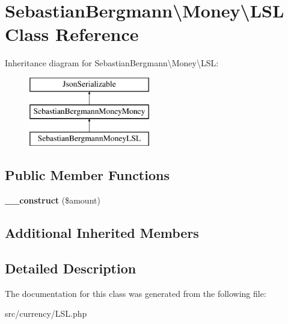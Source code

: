 \hypertarget{classSebastianBergmann_1_1Money_1_1LSL}{}\section{Sebastian\+Bergmann\textbackslash{}Money\textbackslash{}L\+S\+L Class Reference}
\label{classSebastianBergmann_1_1Money_1_1LSL}
Inheritance diagram for Sebastian\+Bergmann\textbackslash{}Money\textbackslash{}L\+S\+L\+:\begin{figure}[H]
\begin{center}
\leavevmode
\includegraphics[height=3.000000cm]{classSebastianBergmann_1_1Money_1_1LSL}
\end{center}
\end{figure}
\subsection*{Public Member Functions}
\begin{DoxyCompactItemize}
\item 
\hypertarget{classSebastianBergmann_1_1Money_1_1LSL_a2327731b4958ba08355ab1673d9d60eb}{}{\bfseries \+\_\+\+\_\+construct} (\$amount)\label{classSebastianBergmann_1_1Money_1_1LSL_a2327731b4958ba08355ab1673d9d60eb}

\end{DoxyCompactItemize}
\subsection*{Additional Inherited Members}


\subsection{Detailed Description}


The documentation for this class was generated from the following file\+:\begin{DoxyCompactItemize}
\item 
src/currency/L\+S\+L.\+php\end{DoxyCompactItemize}
